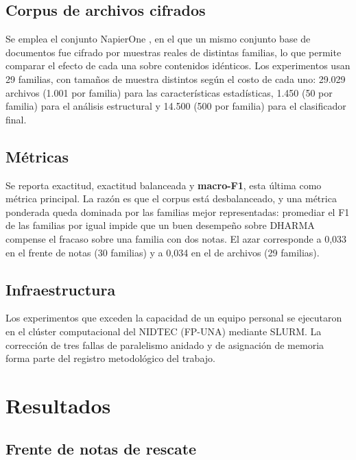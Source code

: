 \documentclass[11pt,a4paper]{article}
\begin{document}
\subsection{Corpus de archivos cifrados}

Se emplea el conjunto NapierOne \cite{napierone2021}, en el que un mismo conjunto base de
documentos fue cifrado por muestras reales de distintas familias, lo que permite comparar el
efecto de cada una sobre contenidos idénticos. Los experimentos usan 29 familias, con tamaños
de muestra distintos según el costo de cada uno: 29.029 archivos (1.001 por familia) para las
características estadísticas, 1.450 (50 por familia) para el análisis estructural y 14.500
(500 por familia) para el clasificador final.

\subsection{Métricas}

Se reporta exactitud, exactitud balanceada y \textbf{macro-F1}, esta última como métrica
principal. La razón es que el corpus está desbalanceado, y una métrica ponderada queda
dominada por las familias mejor representadas: promediar el F1 de las familias por igual
impide que un buen desempeño sobre DHARMA compense el fracaso sobre una familia con dos notas.
El azar corresponde a 0,033 en el frente de notas (30 familias) y a 0,034 en el de archivos
(29 familias).

\subsection{Infraestructura}

Los experimentos que exceden la capacidad de un equipo personal se ejecutaron en el clúster
computacional del NIDTEC (FP-UNA) mediante SLURM. La corrección de tres fallas de
paralelismo anidado y de asignación de memoria forma parte del registro metodológico del
trabajo.

\section{Resultados}

\subsection{Frente de notas de rescate}
\end{document}
